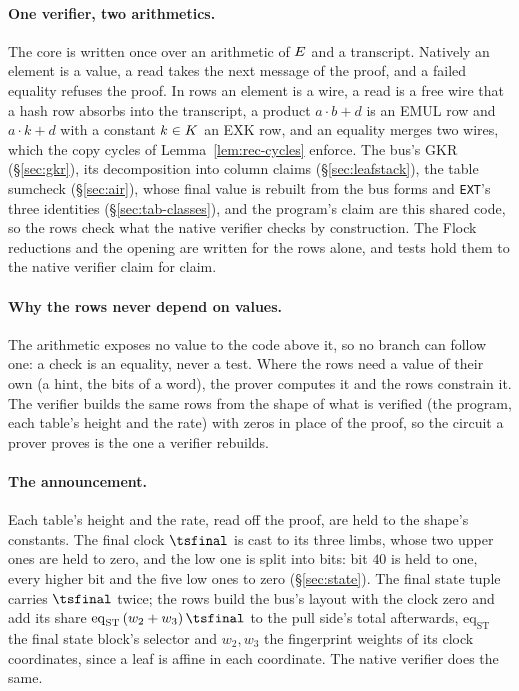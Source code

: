 \paragraph{One verifier, two arithmetics.} The core is written once over an arithmetic of $E$ and a transcript. Natively an element is a value, a read takes the next message of the proof, and a failed equality refuses the proof. In rows an element is a wire, a read is a free wire that a hash row absorbs into the transcript, a product $a\cdot b+d$ is an \textsf{EMUL} row and $a\cdot k+d$ with a constant $k\in K$ an \textsf{EXK} row, and an equality merges two wires, which the copy cycles of Lemma~\ref{lem:rec-cycles} enforce. The bus's GKR (\S\ref{sec:gkr}), its decomposition into column claims (\S\ref{sec:leafstack}), the table sumcheck (\S\ref{sec:air}), whose final value is rebuilt from the bus forms and \texttt{EXT}'s three identities (\S\ref{sec:tab-classes}), and the program's claim are this shared code, so the rows check what the native verifier checks by construction. The Flock reductions and the opening are written for the rows alone, and tests hold them to the native verifier claim for claim.

\paragraph{Why the rows never depend on values.} The arithmetic exposes no value to the code above it, so no branch can follow one: a check is an equality, never a test. Where the rows need a value of their own (a hint, the bits of a word), the prover computes it and the rows constrain it. The verifier builds the same rows from the shape of what is verified (the program, each table's height and the rate) with zeros in place of the proof, so the circuit a prover proves is the one a verifier rebuilds.

\paragraph{The announcement.} Each table's height and the rate, read off the proof, are held to the shape's constants. The final clock $\tsfinal$ is cast to its three limbs, whose two upper ones are held to zero, and the low one is split into bits: bit $40$ is held to one, every higher bit and the five low ones to zero (\S\ref{sec:state}). The final state tuple carries $\tsfinal$ twice; the rows build the bus's layout with the clock zero and add its share $\mathrm{eq}_{\mathrm{ST}}\,(w_2+w_3)\,\tsfinal$ to the pull side's total afterwards, $\mathrm{eq}_{\mathrm{ST}}$ the final state block's selector and $w_2,w_3$ the fingerprint weights of its clock coordinates, since a leaf is affine in each coordinate. The native verifier does the same.

